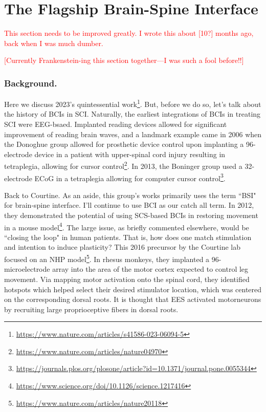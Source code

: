 \section{The Flagship Brain-Spine Interface} 
\textcolor{red}{This section needs to be improved greatly. I wrote this about [10?] months ago, back when I was much dumber.}\newline

\textcolor{red}{[Currently Frankenstein-ing this section together---I was such a fool before!!]}

\subsubsection{Background.} 

Here we discuss 2023's quintessential work\footnote{\url{https://www.nature.com/articles/s41586-023-06094-5}}. But, before we do so, let's talk about the history of BCIs in SCI. Naturally, the earliest integrations of BCIs in treating SCI were EEG-bsaed. Implanted reading devices allowed for significant improvement of reading brain waves, and a landmark example came in 2006 when the Donoghue group allowed for prosthetic device control upon implanting a 96-electrode device in a patient with upper-spinal cord injury resulting in tetraplegia, allowing for cursor control\footnote{\url{https://www.nature.com/articles/nature04970}}. In 2013, the Boninger group used a 32-electrode ECoG in a tetraplegia allowing for computer cursor control\footnote{\url{https://journals.plos.org/plosone/article?id=10.1371/journal.pone.0055344}}.\newline


Back to Courtine. As an aside, this group's works primarily uses the term ``BSI" for brain-spine interface. I'll continue to use BCI as our catch all term. In 2012, they demonstrated the potential of using SCS-based BCIs in restoring movement in a mouse model\footnote{\url{https://www.science.org/doi/10.1126/science.1217416}}. The large issue, as briefly commented elsewhere, would be ``closing the loop" in human patients. That is, how does one match stimulation and intention to induce plasticity? This 2016 precursor by the Courtine lab focused on an NHP model\footnote{\url{https://www.nature.com/articles/nature20118}}. In rhesus monkeys, they implanted a 96-microelectrode array into the area of the motor cortex expected to control leg movement. Via mapping motor activation onto the spinal cord, they identified hotspots which helped select their desired stimulator location, which  was centered on the corresponding dorsal roots. It is thought that EES activated motorneurons by recruiting large proprioceptive fibers in dorsal roots.\newline

